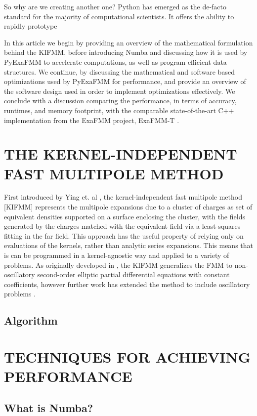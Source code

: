 \documentclass{IEEEcsmag}
\begin{document}
So why are we creating another one?
Python has emerged as the de-facto standard for the majority of computational scientists. It offers the ability to rapidly prototype

In this article we begin by providing an overview of the mathematical formulation behind the KIFMM, before introducing Numba and discussing how it is used by PyExaFMM to accelerate computations, as well as program efficient data structures. We continue, by discussing the mathematical and software based optimizations used by PyExaFMM for performance, and provide an overview of the software design used in order to implement optimizations effectively. We conclude with a discussion comparing the performance, in terms of accuracy, runtimes, and memory footprint, with the comparable state-of-the-art C++ implementation from the ExaFMM project, ExaFMM-T \cite{Wang2021}.

\section{THE KERNEL-INDEPENDENT FAST MULTIPOLE METHOD}

First introduced by Ying et. al \cite{Ying2004}, the kernel-independent fast multipole method [KIFMM] represents the multipole expansions due to a cluster of charges as set of equivalent densities supported on a surface enclosing the cluster, with the fields generated by the charges matched with the equivalent field via a least-squares fitting in the far field. This approach has the useful property of relying only on evaluations of the kernels, rather than analytic series expansions. This means that is can be programmed in a kernel-agnostic way and applied to a variety of problems. As originally developed in \cite{Ying2004}, the KIFMM generalizes the FMM to non-oscillatory second-order elliptic partial differential equations with constant coefficients, however further work has extended the method to include oscillatory problems \cite{Engquist2007}.

\subsection{Algorithm}

\section{TECHNIQUES FOR ACHIEVING PERFORMANCE}

\subsection{What is Numba?}
\end{document}
